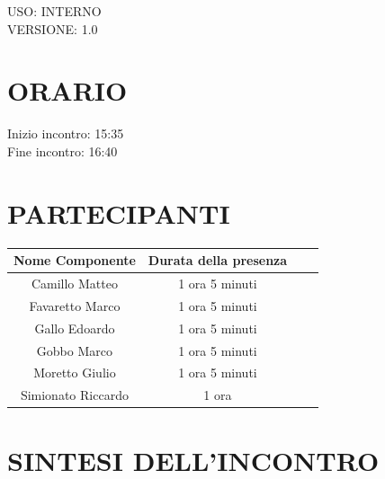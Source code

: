 \documentclass[5pt]{article}
\begin{document}
\begin{flushright}
    \begin{spacing}{1}
        USO: INTERNO\\
        VERSIONE: 1.0\\ %
    \end{spacing}
\end{flushright}


\restoregeometry

\pagebreak


\section{\Large ORARIO}
\begin{spacing}{1.5}
    {\large Inizio incontro: 15:35}\\
    {\large Fine incontro: 16:40}
\end{spacing}

\section{PARTECIPANTI}
\setlength\cellspacetoplimit{6pt}
\setlength\cellspacebottomlimit{6pt}

\begin{table}[ht]
  \begin{tabular}{|Sc|Sc|}
    \hline
    \textbf{Nome Componente} & \textbf{Durata della presenza} \\
    \hline
    Camillo Matteo & 1 ora 5 minuti \\
    Favaretto Marco &1 ora 5 minuti\\
    Gallo Edoardo & 1 ora 5 minuti  \\
    Gobbo Marco & 1 ora 5 minuti \\
    Moretto Giulio & 1 ora 5 minuti \\
    Simionato Riccardo & 1 ora \\
    \hline
  \end{tabular}
  \label{tab:conference}
\end{table}

\section{SINTESI DELL'INCONTRO}
\end{document}
